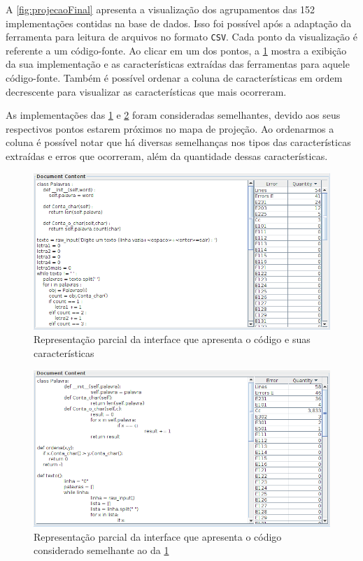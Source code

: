		A \cref{fig:projecaoFinal} apresenta a visualização dos agrupamentos das 152
		implementações contidas na base de dados. Isso foi possível após a adaptação da
		ferramenta para leitura de arquivos no formato \texttt{CSV}. Cada ponto da
		visualização é referente a um código-fonte. Ao clicar em um dos pontos, a
		\cref{fig:codigo1} mostra a exibição da sua implementação e
		as características extraídas das ferramentas para aquele código-fonte. Também
		é possível ordenar a coluna de características  em ordem
		decrescente para visualizar as características que mais ocorreram.
		
		As implementações das \cref{fig:codigo1} e \cref{fig:codigo2} foram consideradas
		semelhantes, devido aos seus respectivos pontos estarem próximos no mapa de
		projeção. Ao ordenarmos a coluna  é possível notar que há
		diversas semelhanças nos tipos das características extraídas e erros que
		ocorreram, além da quantidade dessas características.
		
		\begin{figure}[h]
			\centering
			\includegraphics[width=0.8\linewidth]{imagem/codigo1}
			\caption[Representação parcial da interface que apresenta o código e suas características]
			{Representação parcial da interface que apresenta o código e suas características \cite{Alencar-etal:2012}}
			\label{fig:codigo1}
		\end{figure}
		
		\begin{figure}[H]
			\centering
			\includegraphics[width=0.8\linewidth]{imagem/codigo2}
			\caption[Representação parcial da interface que apresenta o código considerado semelhante ao da \cref{fig:codigo1}]
			{Representação parcial da interface que apresenta o código considerado semelhante ao da \cref{fig:codigo1} \cite{Alencar-etal:2012}}
			\label{fig:codigo2}
		\end{figure}


